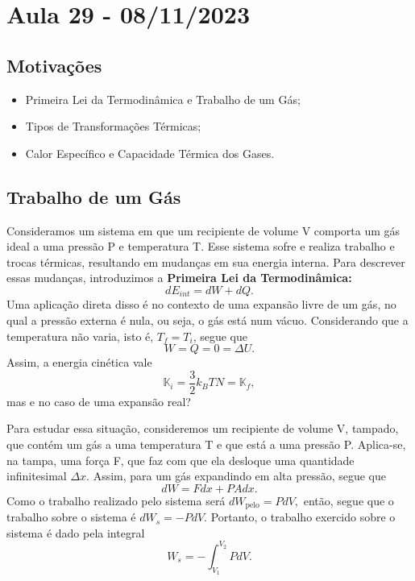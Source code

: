 \documentclass[PhysicsII/phsyicsII_notes.tex]{subfiles}
\begin{document}
\section{Aula 29 - 08/11/2023}
\subsection{Motivações}
\begin{itemize}
	\item Primeira Lei da Termodinâmica e Trabalho de um Gás;
	\item Tipos de Transformações Térmicas;
	\item Calor Específico e Capacidade Térmica dos Gases.
\end{itemize}
\subsection{Trabalho de um Gás}
Consideramos um sistema em que um recipiente de volume V comporta um gás ideal a uma pressão P e
temperatura T. Esse sistema sofre e realiza trabalho e trocas térmicas, resultando em mudanças em sua energia interna.
Para descrever essas mudanças, introduzimos a \textbf{Primeira Lei da Termodinâmica:}
\hypertarget{first_thermodynamics}{
	\[
		\boxed{dE_{int} = dW + dQ.}
	\]}
Uma aplicação direta disso é no contexto de uma expansão livre de um gás, no qual a pressão externa é nula, ou seja,
o gás está num vácuo. Considerando que a temperatura não varia, isto é, \(T_{f} = T_{i}\), segue que
\[
	W = Q = 0 = \Delta U.
\]
Assim, a energia cinética vale
\[
	\mathbb{K}_{i} = \frac{3}{2}k_{B}TN = \mathbb{K}_{f},
\]
mas e no caso de uma expansão real?

Para estudar essa situação, consideremos um recipiente de volume V, tampado, que contém um gás a uma temperatura T e que está
a uma pressão P. Aplica-se, na tampa, uma força F, que faz com que ela desloque uma quantidade infinitesimal \(\Delta x\). Assim,
para um gás expandindo em alta pressão, segue que
\[
	dW = Fdx + PAdx.
\]
Como o trabalho realizado pelo sistema será \(dW_{\text{pelo}} = PdV,\) então, segue que o trabalho sobre o sistema é
\(dW_{s} = -PdV\). Portanto, o trabalho exercido sobre o sistema é dado pela integral
\hypertarget{work_gas}{
	\[
		W_{s} = - \int_{V_{1}}^{V_{2}}PdV.
	\]}
\end{document}
